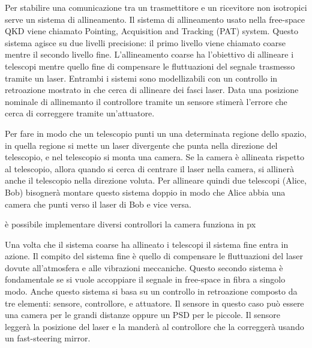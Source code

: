 Per stabilire una comunicazione tra un trasmettitore e un ricevitore non isotropici serve un sistema di allineamento. Il sistema di allineamento usato nella free-space QKD viene chiamato Pointing, Acquisition and Tracking (PAT) system. Questo sistema agisce su due livelli precisione: il primo livello viene chiamato coarse mentre il secondo livello fine. L'allineamento coarse ha l'obiettivo di allineare i telescopi mentre quello fine di compensare le fluttuazioni del segnale trasmesso tramite un laser. Entrambi i sistemi sono modellizabili con un controllo in retroazione mostrato in  che cerca di allineare dei fasci laser. Data una posizione nominale di allinemanto il controllore tramite un sensore stimerà l'errore che cerca di correggere tramite un'attuatore.



Per fare in modo che un telescopio punti un una determinata regione dello spazio, in quella regione si mette un laser divergente che punta nella direzione del telescopio, e nel telescopio si monta una camera. Se la camera è allineata rispetto al telescopio, allora quando si cerca di centrare il laser nella camera, si allinerà anche il telescopio nella direzione voluta. Per allineare quindi due telescopi (Alice, Bob) bisognerà montare questo sistema doppio in modo che Alice abbia una camera che punti verso il laser di Bob e vice versa.

è possibile implementare diversi controllori
la camera funziona in px


Una volta che il sistema coarse ha allineato i telescopi il sistema fine entra in azione. Il compito del sistema fine è quello di compensare le fluttuazioni del laser dovute all'atmosfera e alle vibrazioni meccaniche. Questo secondo sistema è fondamentale se si vuole accoppiare il segnale in free-space in fibra a singolo modo. Anche questo sistema si basa su un controllo in retroazione composto da tre elementi: sensore, controllore, e attuatore. Il sensore in questo caso può essere una camera per le grandi distanze oppure un PSD per le piccole. Il sensore leggerà la posizione del laser e la manderà al controllore che la correggerà usando un fast-steering mirror.